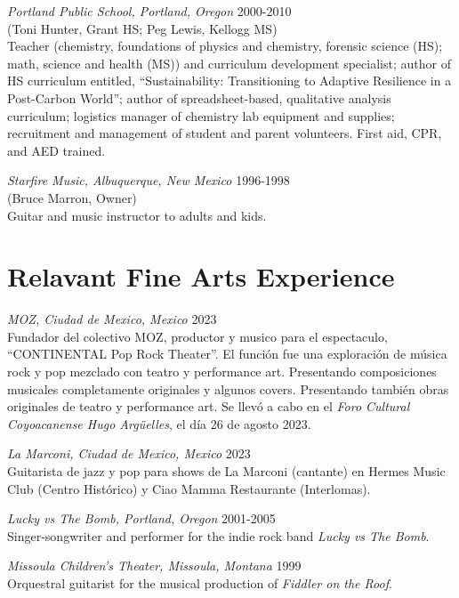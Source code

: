 \begin{resume}
\vspace{0.9cm}

{\sl Portland Public School, Portland, Oregon} \hfill 2000-2010\\
(Toni Hunter, Grant HS;  Peg Lewis, Kellogg MS)\\
Teacher (chemistry, foundations of physics and chemistry, forensic science (HS); math, science and health (MS)) and curriculum development specialist; author of HS curriculum entitled, \enquote{Sustainability: Transitioning to Adaptive Resilience in a Post-Carbon World}; author of spreadsheet-based, qualitative analysis curriculum; logistics manager of chemistry lab equipment and supplies; recruitment and management of student and parent volunteers. First aid, CPR, and AED trained.

{\sl Starfire Music, Albuquerque, New Mexico} \hfill 1996-1998\\
(Bruce Marron, Owner)\\
Guitar and music instructor to adults and kids.

\section {Relavant Fine Arts Experience}

{\sl MOZ, Ciudad de Mexico, Mexico} \hfill 2023\\
Fundador del colectivo MOZ, productor y musico para el espectaculo, \enquote{CONTINENTAL Pop Rock Theater}.  El función fue una exploración de música rock y pop mezclado con teatro y performance art. Presentando composiciones musicales completamente originales y algunos covers.  Presentando también obras originales de teatro y performance art. Se llevó a cabo en el {\sl Foro Cultural Coyoacanense Hugo Argüelles}, el día 26 de agosto 2023.

{\sl La Marconi, Ciudad de Mexico, Mexico} \hfill 2023\\
Guitarista de jazz y pop para shows de La Marconi (cantante) en Hermes Music Club (Centro Histórico) y Ciao Mamma Restaurante (Interlomas).

{\sl Lucky vs The Bomb, Portland, Oregon} \hfill 2001-2005\\
Singer-songwriter and performer for the indie rock band {\sl Lucky vs The Bomb}.

{\sl Missoula Children's Theater, Missoula, Montana} \hfill 1999\\
Orquestral guitarist for the musical production of \textit{Fiddler on the Roof}. 


\end{resume}
